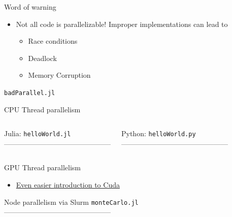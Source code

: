 \documentclass[dvipsnames,pdf,9pt]{beamer}
\newcommand{\<}{\langle}
\renewcommand{\>}{\rangle}
\begin{document}
\begin{frame}[fragile]{Word of warning}
  \begin{itemize}
  \item Not all code is parallelizable! Improper implementations can lead to
    \begin{itemize}
    \item Race conditions
    \item Deadlock
    \item Memory Corruption
    \end{itemize}
  \end{itemize}
  \verb+badParallel.jl+
  

\end{frame}

\begin{frame}[t, fragile]{CPU Thread parallelism}
  \begin{columns}[t]
    Julia: \verb+helloWorld.jl+ \\
    ---------------------------------------------
    \small{
    }

    Python: \verb+helloWorld.py+ \\
    ---------------------------------------------
    \small{
      }

  \end{columns}
\end{frame}

\begin{frame}{GPU Thread parallelism}
  \begin{itemize}
  \item \href{https://developer.nvidia.com/blog/even-easier-introduction-cuda/}{Even easier introduction to Cuda}
  \end{itemize}
\end{frame}

\begin{frame}[fragile]{Node parallelism via Slurm}
  \verb+monteCarlo.jl+ \\
  ---------------------------------------------
  \small{
    }
\end{frame}
\end{document}
